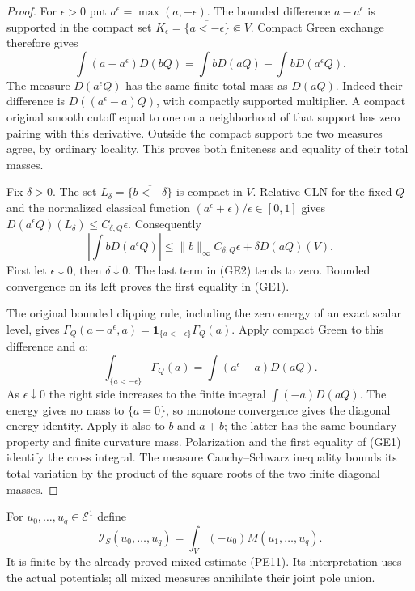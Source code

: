 \documentclass[11pt,a4paper]{article}
\numberwithin{equation}{section}
\theoremstyle{definition}
\theoremstyle{remark}
\begin{document}
\begin{proof}
For $\epsilon>0$ put $a^\epsilon=\max(a,-\epsilon)$.
The bounded difference $a-a^\epsilon$ is supported in the compact
set $K_\epsilon=\overline{\{a<-\epsilon\}}\Subset V$.
Compact Green exchange therefore gives
\[
 \int(a-a^\epsilon)D(bQ)
     =\int bD(aQ)-\int bD(a^\epsilon Q).
 \tag{GE2}
\]
The measure $D(a^\epsilon Q)$ has the same finite total mass as
$D(aQ)$. Indeed their difference is $D((a^\epsilon-a)Q)$,
with compactly supported multiplier. A compact original smooth
cutoff equal to one on a neighborhood of that support has zero
pairing with this derivative. Outside the compact support the
two measures agree, by ordinary locality. This proves both
finiteness and equality of their total masses.

Fix $\delta>0$. The set
$L_\delta=\overline{\{b<-\delta\}}$ is compact in $V$.
Relative CLN for the fixed $Q$ and the normalized classical
function $(a^\epsilon+\epsilon)/\epsilon\in[0,1]$ gives
$D(a^\epsilon Q)(L_\delta)\leq C_{\delta,Q}\epsilon$.
Consequently
\[
 \left|\int bD(a^\epsilon Q)\right|
 \leq \|b\|_\infty C_{\delta,Q}\epsilon
                     +\delta D(aQ)(V).
 \tag{GE3}
\]
First let $\epsilon\downarrow0$, then $\delta\downarrow0$.
The last term in (GE2) tends to zero. Bounded convergence on
its left proves the first equality in (GE1).

The original bounded clipping rule, including the zero energy
of an exact scalar level, gives
$\Gamma_Q(a-a^\epsilon,a)
 =\mathbf1_{\{a<-\epsilon\}}\Gamma_Q(a)$.
Apply compact Green to this difference and $a$:
\[
 \int_{\{a<-\epsilon\}}\Gamma_Q(a)
                 =\int(a^\epsilon-a)D(aQ).
 \tag{GE4}
\]
As $\epsilon\downarrow0$ the right side increases to the
finite integral $\int(-a)D(aQ)$. The energy gives no mass
to $\{a=0\}$, so monotone convergence gives the diagonal
energy identity. Apply it also to $b$ and $a+b$; the latter
has the same boundary property and finite curvature mass.
Polarization and the first equality of (GE1) identify the
cross integral. The measure Cauchy--Schwarz inequality bounds
its total variation by the product of the square roots of the
two finite diagonal masses.
\end{proof}

For $u_0,\ldots,u_q\in\mathcal E^1$ define
\[
 \mathcal I_S(u_0,\ldots,u_q)
       =\int_V(-u_0)M(u_1,\ldots,u_q).
 \tag{GE5}
\]
It is finite by the already proved mixed estimate (PE11).
Its interpretation uses the actual potentials; all mixed
measures annihilate their joint pole union.
\end{document}
